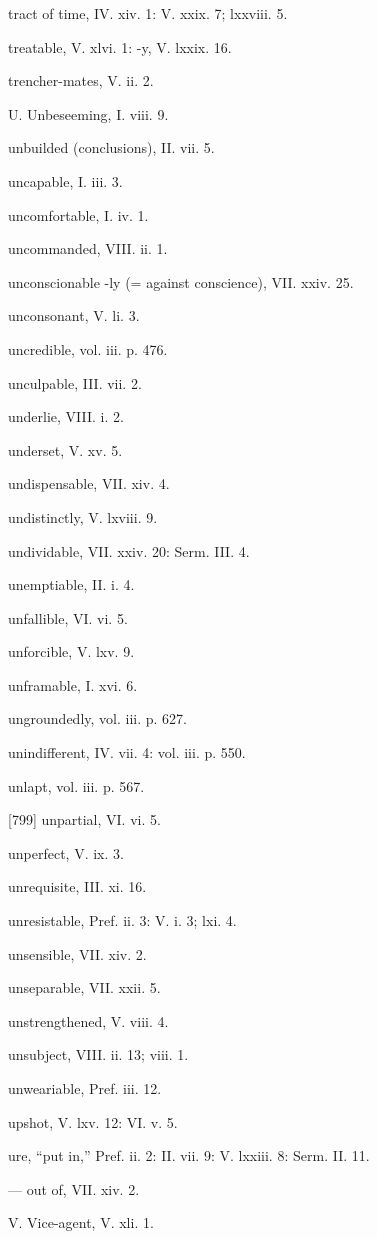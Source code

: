 tract of time, IV. xiv. 1: V. xxix. 7; lxxviii. 5.

treatable, V. xlvi. 1: -y, V. lxxix. 16.

trencher-mates, V. ii. 2.

U.
Unbeseeming, I. viii. 9.

unbuilded (conclusions), II. vii. 5.

uncapable, I. iii. 3.

uncomfortable, I. iv. 1.

uncommanded, VIII. ii. 1.

unconscionable -ly (= against conscience), VII. xxiv. 25.

unconsonant, V. li. 3.

uncredible, vol. iii. p. 476.

unculpable, III. vii. 2.

underlie, VIII. i. 2.

underset, V. xv. 5.

undispensable, VII. xiv. 4.

undistinctly, V. lxviii. 9.

undividable, VII. xxiv. 20: Serm. III. 4.

unemptiable, II. i. 4.

unfallible, VI. vi. 5.

unforcible, V. lxv. 9.

unframable, I. xvi. 6.

ungroundedly, vol. iii. p. 627.

unindifferent, IV. vii. 4: vol. iii. p. 550.

unlapt, vol. iii. p. 567.

[799]
unpartial, VI. vi. 5.

unperfect, V. ix. 3.

unrequisite, III. xi. 16.

unresistable, Pref. ii. 3: V. i. 3; lxi. 4.

unsensible, VII. xiv. 2.

unseparable, VII. xxii. 5.

unstrengthened, V. viii. 4.

unsubject, VIII. ii. 13; viii. 1.

unweariable, Pref. iii. 12.

upshot, V. lxv. 12: VI. v. 5.

ure, “put in,” Pref. ii. 2: II. vii. 9: V. lxxiii. 8: Serm. II. 11.

— out of, VII. xiv. 2.

V.
Vice-agent, V. xli. 1.

